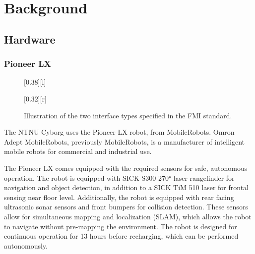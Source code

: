 \documentclass[\rootfolder/main.tex]{subfiles}
\begin{document}
\chapter{Background}
\label{ch:background}


\section{Hardware}


\subsection{Pioneer LX}

\begin{wrapfigure}{R}{0.4\columnwidth}
    \centering
    [0.38\columnwidth][l]{}\par\bigskip
    [0.32\columnwidth][r]{}
    \caption{Illustration of the two interface types specified in the FMI standard.\label{fig:fmi}}
\end{wrapfigure}

The NTNU Cyborg uses the Pioneer LX robot, from MobileRobots.
Omron Adept MobileRobots, previously MobileRobots, is a manufacturer of intelligent mobile robots for commercial and industrial use.

The Pioneer LX comes equipped with the required sensors for safe, autonomous operation.
The robot is equipped with SICK S300 \ang{270} laser rangefinder for navigation and object detection, in addition to a SICK TiM 510 laser for frontal sensing near floor level.
Additionally, the robot is equipped with rear facing ultrasonic sonar sensors and front bumpers for collision detection.
These sensors allow for simultaneous mapping and localization (SLAM), which allows the robot to navigate without pre-mapping the environment.
The robot is designed for continuous operation for 13 hours before recharging, which can be performed autonomously.
\end{document}
